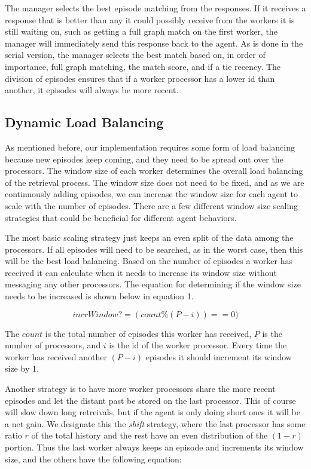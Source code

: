 \documentclass[11pt]{article} %
\begin{document}
The manager selects the best episode matching from the responses. If it receives
a response that is better than any it could possibly receive from the workers it
is still waiting on, such as getting a full graph match on the first worker, the
manager will immediately send this response back to the agent. As is done in the
serial version, the manager selects the best match based on, in order of
importance, full graph matching, the match score, and if a tie recency. The
division of episodes ensures that if a worker processor has a lower id than
another, it episodes will always be more recent.

\subsection{Dynamic Load Balancing}\label{sec:load}

As mentioned before, our implementation requires some form of load balancing
because new episodes keep coming, and they need to be spread out over
the processors. The window size of each worker determines the overall load balancing of the
retrieval process. The window size does not need to be fixed, and as we are
continuously adding episodes, we can increase the window size for each agent to
scale with the number of episodes. There are a few different window size scaling
strategies that could be beneficial for different agent behaviors.

The most basic scaling strategy just keeps an even split of the data among the
processors. If all episodes will need to be searched, as in the worst case, then
this will be the best load balancing. Based on the number of episodes a worker
has received it can calculate when it needs to increase its window size without
messaging any other processors. The equation for determining if the window size
needs to be increased is shown below in equation 1.

\begin{equation}
incrWindow? = (count  \% (P - i )) == 0)
\end{equation}

The $count$ is the total number of episodes this worker has received, $P$ is the
number of processors, and $i$ is the id of the worker processor. Every time the
worker has received another $ (P-i) $ episodes it should increment its window
size by 1.

Another strategy is to have more worker processors share the more recent episodes
and let the distant past be stored on the last processor. This of course will slow down
long retreivals, but if the agent is only doing short ones it will be a net gain. We designate 
this the \emph{shift} strategy, where the last processor has some ratio $r$ of the total
history and the rest have an even distribution of the $(1-r)$ portion. Thus the 
last worker always keeps an episode and increments its window size, and the others 
have the following equation: 
\end{document}
